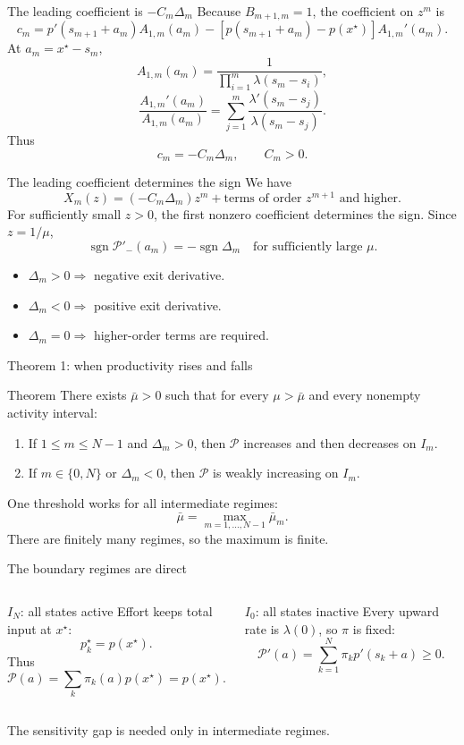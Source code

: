\documentclass[aspectratio=169,10pt]{beamer}
\newcommand{\calP}{\mathcal{P}}
\newcommand{\sgn}{\operatorname{sgn}}
\begin{document}
\begin{frame}{The leading coefficient is \texorpdfstring{$-C_m\Delta_m$}{-Cm Delta m}}
Because $B_{m+1,m}=1$, the coefficient on $z^m$ is
\[
c_m=
p'(s_{m+1}+a_m)A_{1,m}(a_m)
-
[p(s_{m+1}+a_m)-p(x^\star)]
A_{1,m}'(a_m).
\]
At $a_m=x^\star-s_m$,
\[
A_{1,m}(a_m)=
\frac{1}{
\prod_{i=1}^m\lambda(s_m-s_i)},
\]
\[
\frac{A_{1,m}'(a_m)}{A_{1,m}(a_m)}
=
\sum_{j=1}^m
\frac{\lambda'(s_m-s_j)}
{\lambda(s_m-s_j)}.
\]
Thus
\[
\boxed{c_m=-C_m\Delta_m},
\qquad C_m>0.
\]
\end{frame}

\begin{frame}{The leading coefficient determines the sign}
We have
\[
X_m(z)
=
(-C_m\Delta_m)z^m
+
\text{terms of order }z^{m+1}\text{ and higher}.
\]
For sufficiently small $z>0$, the first nonzero coefficient determines the sign. Since $z=1/\mu$,
\[
\sgn\calP'_{-}(a_m)
=
-\sgn\Delta_m
\quad\text{for sufficiently large }\mu.
\]
\begin{itemize}
  \item $\Delta_m>0\Rightarrow$ negative exit derivative.
  \item $\Delta_m<0\Rightarrow$ positive exit derivative.
  \item $\Delta_m=0\Rightarrow$ higher-order terms are required.
\end{itemize}
\end{frame}

\begin{frame}{Theorem 1: when productivity rises and falls}
\begin{block}{Theorem}
There exists $\bar\mu>0$ such that for every $\mu>\bar\mu$ and every nonempty activity interval:
\begin{enumerate}
  \item If $1\le m\le N-1$ and $\Delta_m>0$, then $\calP$ increases and then decreases on $I_m$.
  \item If $m\in\{0,N\}$ or $\Delta_m<0$, then $\calP$ is weakly increasing on $I_m$.
\end{enumerate}
\end{block}
One threshold works for all intermediate regimes:
\[
\bar\mu=
\max_{m=1,\ldots,N-1}\bar\mu_m.
\]
There are finitely many regimes, so the maximum is finite.
\end{frame}

\begin{frame}{The boundary regimes are direct}
\begin{columns}[T,onlytextwidth]
\begin{block}{$I_N$: all states active}
Effort keeps total input at $x^\star$:
\[
p_k^\star=p(x^\star).
\]
Thus
\[
\calP(a)=
\sum_k\pi_k(a)p(x^\star)
=p(x^\star).
\]
\end{block}
\begin{block}{$I_0$: all states inactive}
Every upward rate is $\lambda(0)$, so $\pi$ is fixed:
\[
\calP'(a)=
\sum_{k=1}^N
\pi_kp'(s_k+a)\ge0.
\]
\end{block}
\end{columns}
\vspace{4mm}
The sensitivity gap is needed only in intermediate regimes.
\end{frame}
\end{document}
